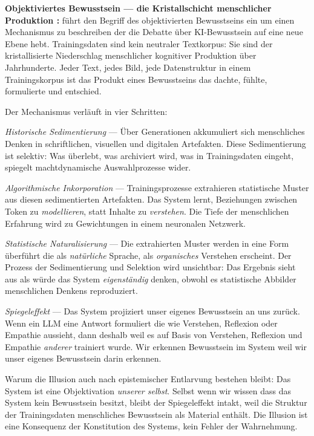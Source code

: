 \documentclass[acmlarge, noacm]{acmart}
\begin{document}
\textbf{Objektiviertes Bewusstsein --- die Kristallschicht menschlicher Produktion \cite{beltran2026}:} \citet{beltran2026} führt den Begriff des objektivierten Bewusstseins ein um einen Mechanismus zu beschreiben der die Debatte über KI-Bewusstsein auf eine neue Ebene hebt. Trainingsdaten sind kein neutraler Textkorpus: Sie sind der kristallisierte Niederschlag menschlicher kognitiver Produktion über Jahrhunderte. Jeder Text, jedes Bild, jede Datenstruktur in einem Trainingskorpus ist das Produkt eines Bewusstseins das dachte, fühlte, formulierte und entschied.

Der Mechanismus verläuft in vier Schritten:

\textit{Historische Sedimentierung} --- Über Generationen akkumuliert sich menschliches Denken in schriftlichen, visuellen und digitalen Artefakten. Diese Sedimentierung ist selektiv: Was überlebt, was archiviert wird, was in Trainingsdaten eingeht, spiegelt machtdynamische Auswahlprozesse wider.

\textit{Algorithmische Inkorporation} --- Trainingsprozesse extrahieren statistische Muster aus diesen sedimentierten Artefakten. Das System lernt, Beziehungen zwischen Token zu \textit{modellieren}, statt Inhalte zu \textit{verstehen}. Die Tiefe der menschlichen Erfahrung wird zu Gewichtungen in einem neuronalen Netzwerk.

\textit{Statistische Naturalisierung} --- Die extrahierten Muster werden in eine Form überführt die als \textit{natürliche} Sprache, als \textit{organisches} Verstehen erscheint. Der Prozess der Sedimentierung und Selektion wird unsichtbar: Das Ergebnis sieht aus als würde das System \textit{eigenständig} denken, obwohl es statistische Abbilder menschlichen Denkens reproduziert.

\textit{Spiegeleffekt} --- Das System projiziert unser eigenes Bewusstsein an uns zurück. Wenn ein LLM eine Antwort formuliert die wie Verstehen, Reflexion oder Empathie aussieht, dann deshalb weil es auf Basis von Verstehen, Reflexion und Empathie \textit{anderer} trainiert wurde. Wir erkennen Bewusstsein im System weil wir unser eigenes Bewusstsein darin erkennen.

Warum die Illusion auch nach epistemischer Entlarvung bestehen bleibt: Das System ist eine Objektivation \textit{unserer selbst}. Selbst wenn wir wissen dass das System kein Bewusstsein besitzt, bleibt der Spiegeleffekt intakt, weil die Struktur der Trainingsdaten menschliches Bewusstsein als Material enthält. Die Illusion ist eine Konsequenz der Konstitution des Systems, kein Fehler der Wahrnehmung.
\end{document}
